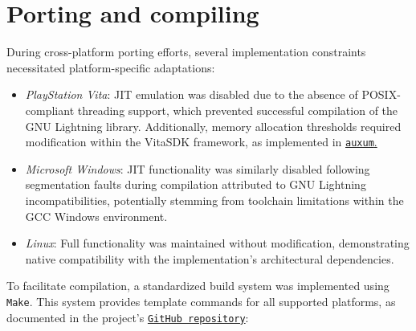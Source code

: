 \section{Porting and compiling}
\label{sec:ch4sec2}

\par During cross-platform porting efforts, several implementation constraints necessitated platform-specific adaptations:
\begin{itemize}
    \item \textit{PlayStation Vita}: JIT emulation was disabled due to the absence of POSIX-compliant threading support, which prevented successful compilation of the GNU Lightning library. Additionally, memory allocation thresholds required modification within the VitaSDK framework, as implemented in \href{https://github.com/solomonarul/auxum/blob/main/inc/auxum/platform/vita/heap.h}{\texttt{auxum}.}
    \item \textit{Microsoft Windows}: JIT functionality was similarly disabled following segmentation faults during compilation attributed to GNU Lightning incompatibilities, potentially stemming from toolchain limitations within the GCC Windows environment.
    \item \textit{Linux}: Full functionality was maintained without modification, demonstrating native compatibility with the implementation's architectural dependencies.
\end{itemize}

\par To facilitate compilation, a standardized build system was implemented using \texttt{Make}. This system provides template commands for all supported platforms, as documented in the project's \href{https://github.com/solomonarul/edra}{\texttt{GitHub repository}}:

